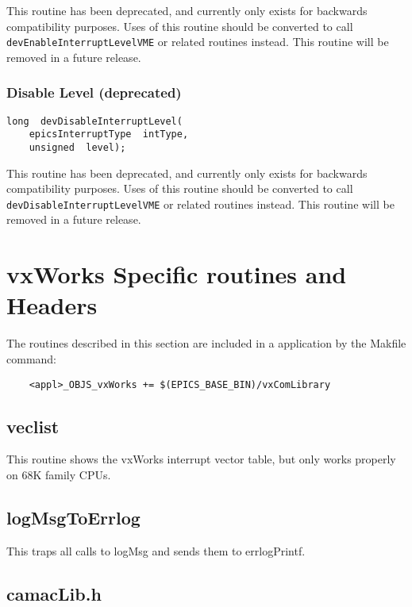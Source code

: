 This routine has been deprecated, and currently only exists for backwards compatibility purposes. Uses of this routine 
should be converted to call \verb|devEnableInterruptLevelVME| or related routines instead. This routine will be removed 
in a future release.

\subsubsection{Disable Level (deprecated)}

\begin{verbatim}
long  devDisableInterruptLevel(
    epicsInterruptType  intType,
    unsigned  level);
\end{verbatim}

This routine has been deprecated, and currently only exists for backwards compatibility purposes. Uses of this routine 
should be converted to call \verb|devDisableInterruptLevelVME| or related routines instead. This routine will be 
removed in a future release.

\section{vxWorks Specific routines and Headers}

The routines described in this section are included in a application by the Makfile command:

\begin{verbatim}
    <appl>_OBJS_vxWorks += $(EPICS_BASE_BIN)/vxComLibrary
\end{verbatim}

\subsection{veclist}

This routine shows the vxWorks interrupt vector table, but only works properly on 68K family CPUs.

\subsection{logMsgToErrlog}

This traps all calls to logMsg and sends them to errlogPrintf.

\subsection{camacLib.h}

